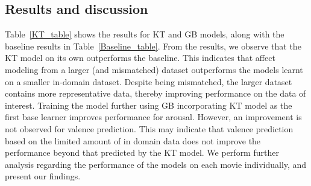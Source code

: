 \documentclass{article}
\begin{document}
\begin{spacing}{0.9}

\vspace{-2mm}
\section{Results and discussion}
\vspace{-2mm}
\label{sec:res}
Table~\ref{KT_table} shows the results for KT and GB models, along with the baseline results in Table~\ref{Baseline_table}.
From the results, we observe that the KT model on its own outperforms the baseline.
This indicates that affect modeling from a larger (and mismatched) dataset outperforms the models learnt on a smaller in-domain dataset.
Despite being mismatched, the larger dataset contains more representative data, thereby improving performance on the data of interest. 
Training the model further using GB incorporating KT model as the first base learner improves performance for arousal. 
However, an improvement is not observed for valence prediction.
This may indicate that valence prediction based on the limited amount of in domain data does not improve the performance beyond that predicted by the KT model.
We perform further analysis regarding the performance of the models on each movie individually, and present our findings. 


\end{spacing}
\end{document}
